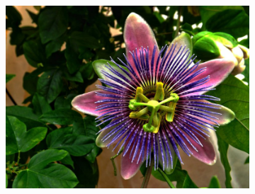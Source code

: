 \documentclass{article}
\begin{document}
\begin{figure}[h]
\begin{subfigure}{.3\textwidth}
  \includegraphics[width=0.97\linewidth]{_Figures/sample_2_normalization_per_channel.png}
    \caption{}
        \label{fig:per_hist_2}
\end{subfigure}



\end{figure}
\end{document}
